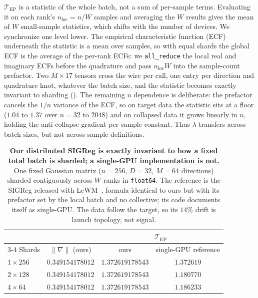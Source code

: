 $\mathcal{T}_{\mathrm{EP}}$ is a statistic of the whole batch, not a sum of per-sample terms. Evaluating it
on each rank's $n_{\mathrm{loc}} = n/W$ samples and averaging the $W$ results gives the mean of $W$ small-sample statistics, which shifts with the number of devices. We synchronize
one level lower. The empirical characteristic function (ECF) underneath the statistic is a mean
over samples, so with equal shards the global ECF is the average of the per-rank ECFs: we
\texttt{all\_reduce} the local real and imaginary ECFs before the quadrature and pass
$n_{\mathrm{loc}}W$ into the sample-count prefactor. Two $M\times17$ tensors cross the wire per
call, one entry per direction and quadrature knot, whatever the batch size, and the statistic
becomes exactly invariant to sharding (). The remaining $n$ dependence
is deliberate: the prefactor cancels the $1/n$ variance of the ECF, so on target data the
statistic sits at a floor ($1.04$ to $1.37$ over $n = 32$ to $2048$) and on collapsed data it
grows linearly in $n$, holding the anti-collapse gradient per sample constant. Thus $\lambda$
transfers across batch sizes, but not across sample definitions.

\begin{table}[ht]
\centering
\small
\caption{\textbf{Our distributed SIGReg is exactly invariant to how a fixed total batch is
sharded; a single-GPU implementation is not.} One fixed Gaussian matrix ($n=256$, $D=32$,
$M=64$ directions) sharded contiguously across $W$ ranks in \texttt{float64}. The reference is the SIGReg released with LeWM~\citep{maes2026lewm}, formula-identical to ours but with its prefactor set by the local batch and no collective; its code documents itself as single-GPU. The data follow the target, so its $14\%$ drift is launch topology, not signal.}
\label{tab:sigreg-ws}
\begin{tabular}{lccc}
\toprule
& & \multicolumn{2}{c}{$\mathcal{T}_{\mathrm{EP}}$} \\
\cmidrule(l){3-4}
Shards & $\|\nabla\|$ (ours) & ours & single-GPU reference \\
\midrule
$1 \times 256$ & $0.349154178012$ & $1.372619178543$ & $1.372619$ \\
$2 \times 128$ & $0.349154178012$ & $1.372619178543$ & $1.180770$ \\
$4 \times 64$  & $0.349154178012$ & $1.372619178543$ & $1.186233$ \\
\bottomrule
\end{tabular}
\end{table}

